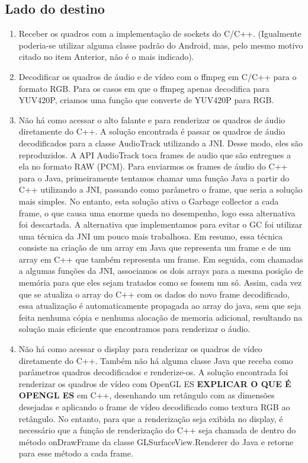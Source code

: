 \documentclass{acm_proc_article-sp}
\newcommand{\todo}[1]{\textcolor[rgb]{1.00,0.00,0.00}{\bf \uppercase{#1}}}
\begin{document}
\subsection{Lado do destino}
\begin{enumerate}
 \item Receber os quadros com a implementação de sockets do C/C++. (Igualmente poderia-se utilizar alguma classe padrão do Android, mas, pelo mesmo motivo citado no item Anterior, não é o mais indicado).
 \item Decodificar os quadros de áudio e de vídeo com o ffmpeg em C/C++ para o formato RGB. Para os casos em que o ffmpeg apenas decodifica para YUV420P, criamos uma função que converte de YUV420P para RGB.
 \item Não há como acessar o alto falante e para renderizar os quadros de áudio diretamente do C++. A solução encontrada é passar os quadros de áudio decodificados para a classe AudioTrack utilizando a JNI. Desse modo, eles são reproduzidos. A API AudioTrack toca frames de audio que são entregues a ela no formato RAW (PCM). Para enviarmos os frames de áudio do C++ para o Java, primeiramente tentamos chamar uma função Java a partir do C++ utilizando a JNI, passando como parâmetro o frame, que seria a solução mais simples. No entanto, esta solução ativa o Garbage collector a cada frame, o que causa uma enorme queda no desempenho, logo essa alternativa foi descartada. A alternativa que implementamos para evitar o GC foi utilizar uma técnica da JNI um pouco mais trabalhosa. Em resumo, essa técnica consiste na criação de um array em Java que representa um frame e de um array em C++ que também representa um frame. Em seguida, com chamadas a algumas funções da JNI, associamos os dois arrays para a mesma posição de memória para que eles sejam tratados como se fossem um só. Assim, cada vez que se atualiza o array do C++ com os dados do novo frame decodificado, essa atualização é automaticamente propagada ao array do java, sem que seja feita nenhuma cópia e nenhuma alocação de memoria adicional, resultando na solução mais eficiente que encontramos para renderizar o áudio.
 \item Não há como acessar o display para renderizar os quadros de vídeo diretamente do C++. Também não há alguma classe Java que receba como parâmetros quadros decodificados e renderize-os. A solução encontrada foi renderizar os quadros de vídeo com OpenGL ES \todo{explicar o que é opengl es} em C++, desenhando um retângulo com as dimensões desejadas e aplicando o frame de vídeo decodificado como textura RGB ao retângulo. No entanto, para que a renderização seja exibida no display, é necessário que a função de renderização do C++ seja chamada de dentro do método onDrawFrame da classe GLSurfaceView.Renderer do Java e retorne para esse método a cada frame.
\end{enumerate}
\end{document}
